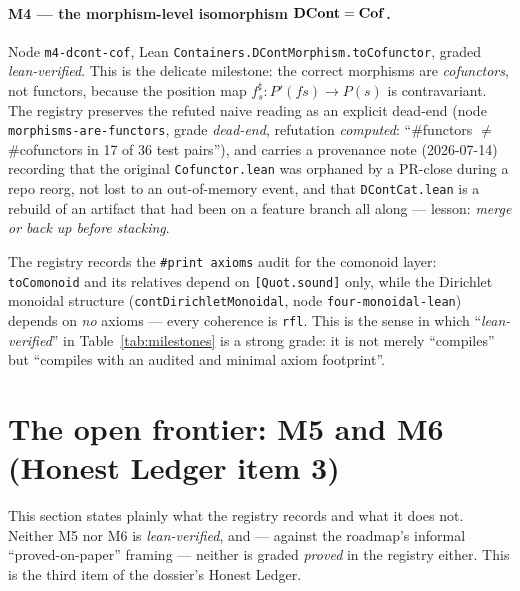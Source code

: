 \paragraph{M4 --- the morphism-level isomorphism $\mathbf{DCont}=\mathbf{Cof}$.}
Node \texttt{m4-dcont-cof}, Lean \texttt{Containers.DContMorphism.toCofunctor},
graded \emph{lean-verified}. This is the delicate milestone: the correct morphisms
are \emph{cofunctors}, not functors, because the position map
$f^{\sharp}_{s}\colon P'(fs)\to P(s)$ is contravariant. The registry preserves the
refuted naive reading as an explicit dead-end (node \texttt{morphisms-are-functors},
grade \emph{dead-end}, refutation \emph{computed}: ``\#functors $\neq$ \#cofunctors
in 17 of 36 test pairs''), and carries a provenance note (2026-07-14) recording
that the original \texttt{Cofunctor.lean} was orphaned by a PR-close during a repo
reorg, not lost to an out-of-memory event, and that \texttt{DContCat.lean} is a
rebuild of an artifact that had been on a feature branch all along --- lesson:
\emph{merge or back up before stacking}.

\begin{remark}\label{rem:mile-axioms}
The registry records the \texttt{\#print axioms} audit for the comonoid layer:
\texttt{toComonoid} and its relatives depend on \texttt{[Quot.sound]} only, while
the Dirichlet monoidal structure (\texttt{contDirichletMonoidal}, node
\texttt{four-monoidal-lean}) depends on \emph{no} axioms --- every coherence is
\texttt{rfl}. This is the sense in which ``\emph{lean-verified}'' in
Table~\ref{tab:milestones} is a strong grade: it is not merely ``compiles'' but
``compiles with an audited and minimal axiom footprint''.
\end{remark}

\section{The open frontier: M5 and M6 (Honest Ledger item 3)}\label{sec:mile-open}

This section states plainly what the registry records and what it does not. Neither
M5 nor M6 is \emph{lean-verified}, and --- against the roadmap's informal
``proved-on-paper'' framing --- neither is graded \emph{proved} in the registry
either. This is the third item of the dossier's Honest Ledger.

